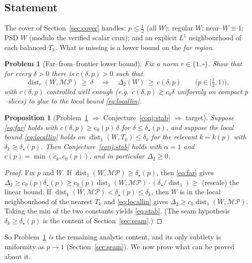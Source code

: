 \documentclass[11pt]{article}
\newtheorem{proposition}[theorem]{Proposition}
\newtheorem{problem}[theorem]{Problem}
\theoremstyle{definition}
\newcommand{\dist}{\operatorname{dist}}
\newcommand{\MP}{\mathcal{MP}}
\newcommand{\Tk}{T_k}
\begin{document}
\subsection{Statement}

The cover of Section~\ref{sec:cover} handles: $p\le\tfrac12$ (all $W$); regular
$W$; near--$W\equiv1$; PSD $W$ (modulo the verified scalar crux); and an explicit
$L^1$ neighbourhood of each balanced $\Tk$.  What is missing is a lower bound on
the \emph{far region}.

\begin{problem}[Far--from--frontier lower bound]\label{prob:far}
Fix a norm $r\in\{1,\square\}$.  Show that for every $\delta>0$ there is
$c(\delta,p)>0$ such that
\begin{equation}\label{eq:far}
  \dist_r(W,\MP)\ \ge\ \delta\quad\Longrightarrow\quad \Delta_2(W)\ \ge\ c(\delta,p)
  \qquad\big(p\in[\tfrac12,1)\big),
\end{equation}
with $c(\delta,p)$ controlled well enough (e.g.\ $c(\delta,p)\gtrsim c_0\delta$
uniformly on compact $p$--slices) to glue to the local bound \eqref{eq:locallin}.
\end{problem}

\begin{proposition}[Problem~\ref{prob:far} $\Rightarrow$ Conjecture~\ref{conj:stab}
$\Rightarrow$ target]\label{prop:closes}
Suppose \eqref{eq:far} holds with $c(\delta,p)\ge c_0(p)\,\delta$ for
$\delta\le\delta_\star(p)$, and suppose the local bound \eqref{eq:locallin} holds on
$\dist_1(W,\Tk)\le\delta_k$ for the relevant $k=k(p)$ with $\delta_k\ge\delta_\star(p)$.
Then Conjecture~\ref{conj:stab} holds with $\alpha=1$ and $c(p)=\min(c_k,c_0(p))$,
and in particular $\Delta_2\ge0$.
\end{proposition}
\begin{proof}
Fix $p$ and $W$.  If $\dist_1(W,\MP)\ge\delta_\star(p)$, then \eqref{eq:far} gives
$\Delta_2\ge c_0(p)\delta_\star(p)\ge c_0(p)\dist_1(W,\MP)\cdot
(\delta_\star/\dist_1)\ge$ (rescale) the linear bound.  If
$\dist_1(W,\MP)<\delta_\star(p)\le\delta_k$, then $W$ is in the local
neighbourhood of the nearest $\Tk$ and \eqref{eq:locallin} gives
$\Delta_2\ge c_k\dist_1(W,\MP)$.  Taking the min of the two constants yields
\eqref{eq:stab}.  (The seam hypothesis $\delta_k\ge\delta_\star(p)$ is the content
of Section~\ref{sec:seam}.)
\end{proof}

So Problem~\ref{prob:far} \emph{is} the remaining analytic content, and its only
subtlety is uniformity as $p\to1$ (Section~\ref{sec:seam}).  We now prove what can
be proved about it.
\end{document}
